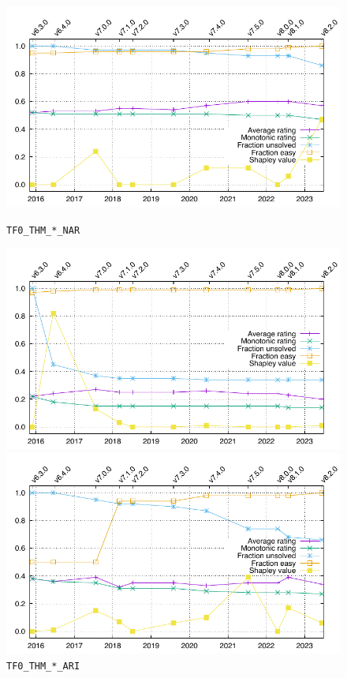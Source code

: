 \documentclass[runningheads]{llncs}
\begin{document}
\begin{figure}[h!]
\centering
\begin{minipage}[t]{.49\textwidth}
  \centering
  \includegraphics[width=\textwidth]{Plots/GNUPlots/TF0_THM_NAR.pdf}
  \vspace*{-2em}
  \caption{{\tt TF0\_THM\_*\_NAR}}
  \label{Plot_TF0_THM_NAR}
\end{minipage}
\begin{minipage}[t]{.49\textwidth}
  \centering
  \includegraphics[width=\textwidth]{Plots/GNUPlots/TF0_THM_ARI.pdf}
  \vspace*{-2em}
  \caption{{\tt TF0\_THM\_*\_ARI}}
  \label{Plot_TF0_THM_ARI}
\end{minipage}
\begin{minipage}[t]{.49\textwidth}
  \centering
  \includegraphics[width=\textwidth]{Plots/GNUPlots/TH0_THM_NAR.pdf}

\end{minipage}
\end{figure}
\end{document}
